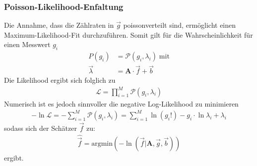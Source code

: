\subsubsection{Poisson-Likelihood-Enfaltung}
Die Annahme, dass die Zählraten in $\vec{g}$ poissonverteilt sind, ermöglicht einen Maximum-Likelihood-Fit durchzuführen. Somit gilt für die Wahrscheinlichkeit für einen Messwert $g_{i}$
\begin{align}
	P(g_{i}) &= \mathcal{P}(g_{i},\lambda_{i}) \; \text{mit}\\
	\vec{\lambda} &= \pmb{A} \cdot \vec{f} + \vec{b}
\end{align}
Die Likelihood ergibt sich folglich zu
\begin{align}
	\mathcal{L} = \prod_{i=1}^{M}\mathcal{P}(g_{i},\lambda_{i})
\end{align}
Numerisch ist es jedoch sinnvoller die negative Log-Likelihood zu minimieren
\begin{align}
	- \ln\mathcal{L} = - \sum_{i=1}^{M}\mathcal{P}(g_{i},\lambda_{i}) = \sum_{i=1}^{M}\ln(g_{i}!) - g_{i} \cdot \ln \lambda_{i} +\lambda_{i}
\end{align}
sodass sich der Schätzer $\vec{f}$ zu:
\begin{align}
	\hat{\vec{f}} = \text{argmin}\left( -\ln(\vec{f}|\pmb{A},\vec{g},\vec{b})\right)
\end{align}
ergibt.
